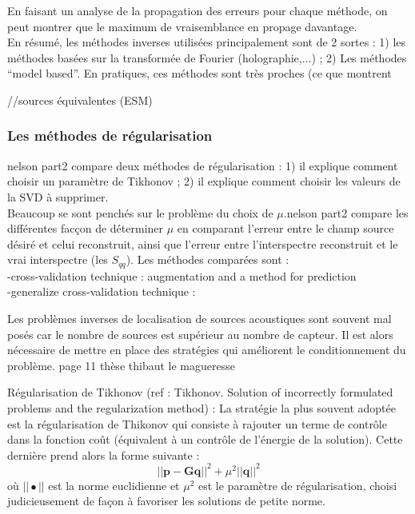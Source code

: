 En faisant un analyse de la propagation des erreurs pour chaque méthode, on peut montrer que le maximum de vraisemblance en propage davantage.\\

En résumé, les méthodes inverses utilisées principalement sont de 2 sortes : 1) les méthodes basées sur la transformée de Fourier (holographie,...) ; 2) Les méthodes ``model based''. En pratiques, ces méthodes sont très proches (ce que montrent %





//sources équivalentes (ESM)

\subsubsection{Les méthodes de régularisation}
nelson part2 compare deux méthodes de régularisation : 1) il explique comment choisir un paramètre de Tikhonov ; 2) il explique comment choisir les valeurs de la SVD à supprimer.\\ Beaucoup se sont penchés sur le problème du choix de $\mu$.nelson part2 compare les différentes facçon de déterminer $\mu$ en comparant l'erreur entre le champ source désiré et celui reconstruit, ainsi que l'erreur entre l'interspectre reconstruit et le vrai interspectre (les $S_{qq}$). Les méthodes comparées sont : \\
-cross-validation technique : %
augmentation and a method for prediction\\
-generalize cross-validation technique : %






Les problèmes inverses de localisation de sources acoustiques sont souvent mal posés car le nombre de sources est supérieur au nombre de capteur. Il est alors nécessaire de mettre en place des stratégies qui améliorent le conditionnement du problème. 
page 11 thèse thibaut le magueresse

Régularisation de Tikhonov (ref : Tikhonov. Solution of incorrectly formulated problems and the regularization method) : La stratégie la plus souvent adoptée est la régularisation de Thikonov qui consiste à rajouter un terme de contrôle dans la fonction coût (équivalent à un contrôle de l'énergie de la solution). Cette dernière prend alors la forme suivante : 
\begin{equation}
	||\bm{p}-\bm{G}\bm{q}||^2 + \mu^2||\bm{q}||^2
\end{equation}
où $||\bullet||$ est la norme euclidienne et $\mu^2$ est le paramètre de régularisation, choisi judicieusement de façon à favoriser les solutions de petite norme.

